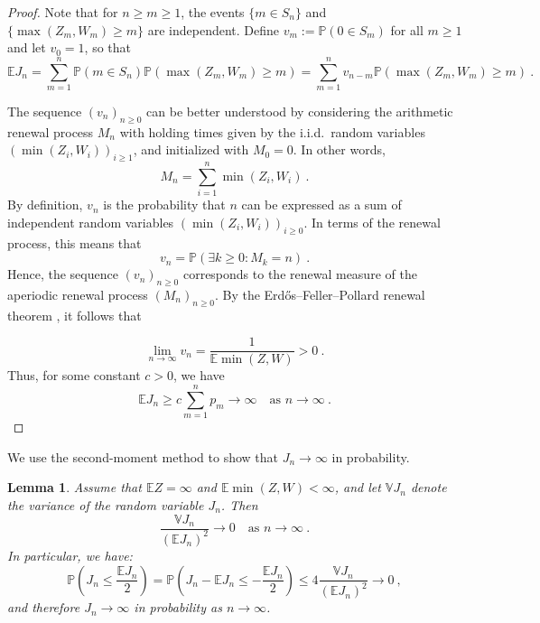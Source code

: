 \documentclass[12pt]{article}
\newcommand{\E}{\mathbb{E}}
\newtheorem{lemma}[theorem]{Lemma}
\numberwithin{equation}{section} \font\titre=cmbx12
\newcommand{\V}{\mathbb{V}}
\newcommand{\PP}{\mathbb{P}}
\begin{document}
\begin{proof}  
Note that for $n\ge m\ge 1$, the events $\{m\in S_n\}$ and $\{ \max(Z_m,W_m) \ge m\}$ are independent. Define $v_m := \PP(0\in S_m)$ for all $m\ge 1$ and let $v_0=1$, so that $$\E J_n = \sum_{m=1}^n\PP(m\in S_n) \PP(\max(Z_m,W_m) \ge m) = \sum_{m=1}^n v_{n-m}\PP(\max(Z_m,W_m) \ge m)~. $$

\color{black}
\noindent The sequence $(v_n)_{n\ge 0}$ can be better understood by considering the arithmetic renewal process $M_n$ with holding times given by the i.i.d.\ random variables $(\min(Z_i,W_i))_{i\ge 1}$, and initialized with $M_0 = 0$. In other words,  
\[
M_n = \sum_{i=1}^n \min(Z_i,W_i)~.
\]
By definition, $v_n$ is the probability that $n$ can be expressed as a sum of independent random variables $(\min(Z_i,W_i))_{i\ge 0}$. In terms of the renewal process, this means that
\[
v_n = \PP(\exists k \ge 0 : M_k = n)~.
\]
Hence, the sequence $(v_n)_{n \ge 0}$ corresponds to the renewal measure of the aperiodic renewal process $(M_n)_{n \ge 0}$. By the Erd\H{o}s–Feller–Pollard renewal theorem \cite{erdos1949theorem}, it follows that
\color{black}




\begin{equation}
\lim_{n \to \infty} v_n =   \frac{1}{\E \min (Z,W)} >0~. \label{convergence vn}
\end{equation}
Thus, for some constant $c>0$, we have 
\begin{equation}
\E J_n \ge c \sum_{m=1}^n p_m \to \infty \quad \text{as } n\to \infty~. \label{lowerbound}
\end{equation}
\end{proof}

\noindent
We use the second-moment method to show that $J_n \to \infty$ in probability.



\begin{lemma}\label{Lemma second moment}
Assume that $\E Z = \infty$ and $\E \min (Z,W) < \infty$, and let $\V J_n$ denote the variance of the random variable $J_n$. Then
\begin{equation}
\frac{\V J_n}{(\E J_n)^2}\to 0 \quad \text{as } n \to \infty~. \label{scnd moment method}
\end{equation}
In particular, we have:
$$\PP\left(J_n\le \frac{\E J_n}{2}\right)=\PP\left(J_n - \E J_n \le - \frac{\E J_n}{2}\right)\le 4\frac{\V J_n}{(\E J_n)^2}\to 0~,$$
and therefore $J_n \to \infty$ in probability as $n \to \infty$.
\end{lemma}
\end{document}
